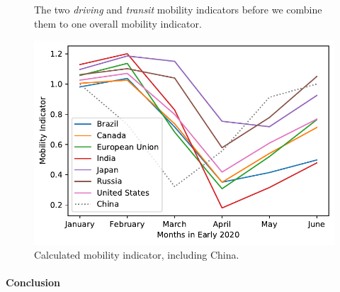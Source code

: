 \begin{figure}[ht!]
	\centering
	\hfill
	\caption{The two \textit{driving} and \textit{transit} mobility indicators before we combine them to one overall mobility indicator.}
	\label{fig:both_mobility_indicators}
	\end{figure}
	
	\begin{figure}[hb!]
		\centering
		\includegraphics[width=0.7\linewidth]{../predictions/full_mobility_indicator.pdf}
		\caption{Calculated mobility indicator, including China.}
		\label{fig:indicator_mobility}
		\end{figure}
		
		\paragraph{Conclusion}
		
